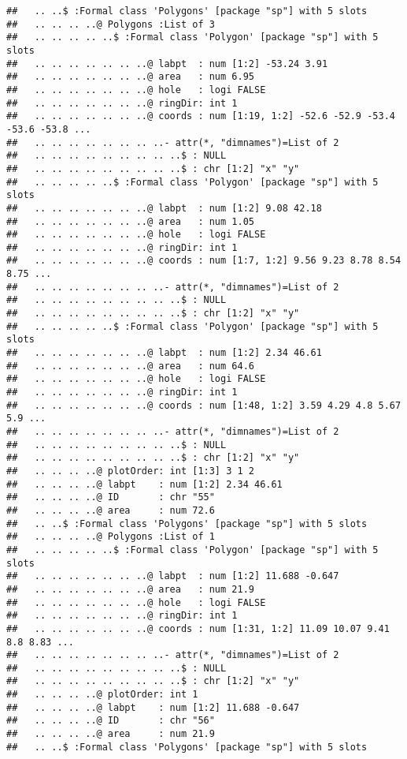 \documentclass[]{article}
\begin{document}
\begin{verbatim}
##   .. ..$ :Formal class 'Polygons' [package "sp"] with 5 slots
##   .. .. .. ..@ Polygons :List of 3
##   .. .. .. .. ..$ :Formal class 'Polygon' [package "sp"] with 5 slots
##   .. .. .. .. .. .. ..@ labpt  : num [1:2] -53.24 3.91
##   .. .. .. .. .. .. ..@ area   : num 6.95
##   .. .. .. .. .. .. ..@ hole   : logi FALSE
##   .. .. .. .. .. .. ..@ ringDir: int 1
##   .. .. .. .. .. .. ..@ coords : num [1:19, 1:2] -52.6 -52.9 -53.4 -53.6 -53.8 ...
##   .. .. .. .. .. .. .. ..- attr(*, "dimnames")=List of 2
##   .. .. .. .. .. .. .. .. ..$ : NULL
##   .. .. .. .. .. .. .. .. ..$ : chr [1:2] "x" "y"
##   .. .. .. .. ..$ :Formal class 'Polygon' [package "sp"] with 5 slots
##   .. .. .. .. .. .. ..@ labpt  : num [1:2] 9.08 42.18
##   .. .. .. .. .. .. ..@ area   : num 1.05
##   .. .. .. .. .. .. ..@ hole   : logi FALSE
##   .. .. .. .. .. .. ..@ ringDir: int 1
##   .. .. .. .. .. .. ..@ coords : num [1:7, 1:2] 9.56 9.23 8.78 8.54 8.75 ...
##   .. .. .. .. .. .. .. ..- attr(*, "dimnames")=List of 2
##   .. .. .. .. .. .. .. .. ..$ : NULL
##   .. .. .. .. .. .. .. .. ..$ : chr [1:2] "x" "y"
##   .. .. .. .. ..$ :Formal class 'Polygon' [package "sp"] with 5 slots
##   .. .. .. .. .. .. ..@ labpt  : num [1:2] 2.34 46.61
##   .. .. .. .. .. .. ..@ area   : num 64.6
##   .. .. .. .. .. .. ..@ hole   : logi FALSE
##   .. .. .. .. .. .. ..@ ringDir: int 1
##   .. .. .. .. .. .. ..@ coords : num [1:48, 1:2] 3.59 4.29 4.8 5.67 5.9 ...
##   .. .. .. .. .. .. .. ..- attr(*, "dimnames")=List of 2
##   .. .. .. .. .. .. .. .. ..$ : NULL
##   .. .. .. .. .. .. .. .. ..$ : chr [1:2] "x" "y"
##   .. .. .. ..@ plotOrder: int [1:3] 3 1 2
##   .. .. .. ..@ labpt    : num [1:2] 2.34 46.61
##   .. .. .. ..@ ID       : chr "55"
##   .. .. .. ..@ area     : num 72.6
##   .. ..$ :Formal class 'Polygons' [package "sp"] with 5 slots
##   .. .. .. ..@ Polygons :List of 1
##   .. .. .. .. ..$ :Formal class 'Polygon' [package "sp"] with 5 slots
##   .. .. .. .. .. .. ..@ labpt  : num [1:2] 11.688 -0.647
##   .. .. .. .. .. .. ..@ area   : num 21.9
##   .. .. .. .. .. .. ..@ hole   : logi FALSE
##   .. .. .. .. .. .. ..@ ringDir: int 1
##   .. .. .. .. .. .. ..@ coords : num [1:31, 1:2] 11.09 10.07 9.41 8.8 8.83 ...
##   .. .. .. .. .. .. .. ..- attr(*, "dimnames")=List of 2
##   .. .. .. .. .. .. .. .. ..$ : NULL
##   .. .. .. .. .. .. .. .. ..$ : chr [1:2] "x" "y"
##   .. .. .. ..@ plotOrder: int 1
##   .. .. .. ..@ labpt    : num [1:2] 11.688 -0.647
##   .. .. .. ..@ ID       : chr "56"
##   .. .. .. ..@ area     : num 21.9
##   .. ..$ :Formal class 'Polygons' [package "sp"] with 5 slots

\end{verbatim}
\end{document}
